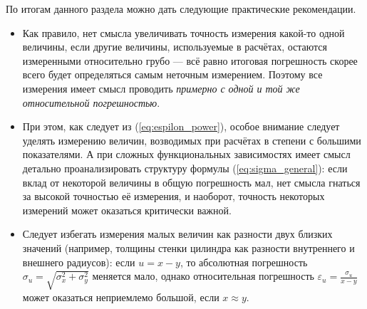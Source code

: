 По итогам данного раздела можно дать следующие практические рекомендации.
\begin{itemize}
\item Как правило, нет смысла увеличивать точность измерения какой-то одной
величины, если другие величины, используемые в расчётах, остаются
измеренными относительно грубо --- всё равно итоговая погрешность
скорее всего будет определяться самым неточным измерением. Поэтому
все измерения имеет смысл проводить \emph{примерно с одной и той же
относительной погрешностью}.
\item При этом, как следует из (\ref{eq:espilon_power}), особое внимание
следует уделять измерению величин, возводимых при расчётах в степени
с большими показателями. А при сложных функциональных зависимостях
имеет смысл детально проанализировать структуру формулы
(\ref{eq:sigma_general}):
если вклад от некоторой величины в общую погрешность мал, нет смысла
гнаться за высокой точностью её измерения, и наоборот, точность некоторых
измерений может оказаться критически важной.
\item Следует избегать измерения малых величин как разности двух близких
значений (например, толщины стенки цилиндра как разности внутреннего
и внешнего радиусов): если $u=x-y$, то абсолютная погрешность
$\sigma_{u}=\sqrt{\sigma_{x}^{2}+\sigma_{y}^{2}}$
меняется мало, однако относительная погрешность
$\varepsilon_{u}=\frac{\sigma_{u}}{x-y}$
может оказаться неприемлемо большой, если $x\approx y$.
\end{itemize}
